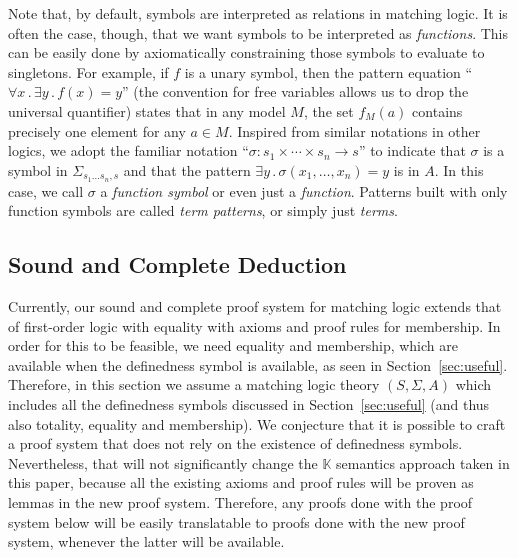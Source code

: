 \documentclass[UTF8,11pt]{article}
\theoremstyle{plain}
\theoremstyle{definition}
\theoremstyle{remark}
\newcommand{\K}{\mbox{$\mathbb{K}$}\xspace}
\newcommand{\ra}{\rightarrow}
\begin{document}
Note that, by default, symbols are interpreted as relations in matching logic.
It is often the case, though, that we want symbols to be interpreted as
\emph{functions}.
This can be easily done by axiomatically constraining those symbols to evaluate to
singletons.
For example, if $f$ is a unary symbol, then the pattern equation
``$\forall x\,.\,\exists y\,.\,f(x) = y$'' (the convention for free variables
allows us to drop the universal quantifier) states that in any model
$M$, the set $f_M(a)$ contains precisely one element for any $a\in M$.
%
Inspired from similar notations in other logics,
we adopt the familiar notation
``$\sigma : s_1 \times \cdots \times s_n \ra s$''
to indicate that $\sigma$ is a symbol in $\Sigma_{s_1\ldots s_n,s}$ and that
the pattern
$
\exists y\,.\,\sigma(x_1,\ldots,x_n) = y
$ is in $A$.
In this case, we call $\sigma$ a \emph{function symbol} or even just a
\emph{function}.
Patterns built with only function symbols are called
\emph{term patterns}, or simply just \emph{terms}.


\subsection{Sound and Complete Deduction}
\label{sec:deduction}

Currently, our sound and complete proof system for matching logic extends that
of first-order logic with equality with axioms and proof rules for membership.
In order for this to be feasible, we need equality and membership, which are
available when the definedness symbol is available, as seen in
Section~\ref{sec:useful}.
Therefore, in this section we assume a matching logic theory $(S,\Sigma,A)$
which includes all the definedness symbols discussed in Section~\ref{sec:useful}
(and thus also totality, equality and membership).
We conjecture that it is possible to craft a proof system that does not rely on
the existence of definedness symbols.
Nevertheless, that will not significantly change the \K semantics approach taken
in this paper, because all the existing axioms and proof rules will be proven as
lemmas in the new proof system.
Therefore, any proofs done with the proof system below will be easily translatable
to proofs done with the new proof system, whenever the latter will be available.

\newcommand{\sequent}[2]{{#1}\vdash{#2}}
\end{document}
